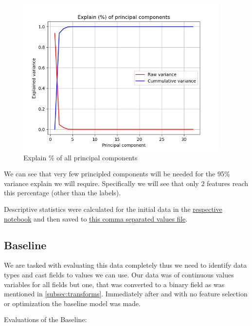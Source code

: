 \documentclass[12pt, a4paper]{article}
\begin{document}
\begin{figure}[H]
    \begin{center}
        \includegraphics[width=0.95\textwidth]{figures/Explain of all principaled components.png}
    \end{center}
    \caption{Explain \% of all principal components}\label{fig:PCA search}
\end{figure}

\begin{multicols}{2}

    We can see that very few principled components will be needed for the 95\% variance explain we will require. Specifically we will see that only $2$ features reach this percentage (other than the labels).
    \newline

    Descriptive statistics were calculated for the initial data in the \href{https://github.com/ArisPodotas/Assignment-2-MLICB/blob/master/notebooks/Feeling%20the%20data.ipynb}{respective notebook} and then saved to \href{https://github.com/ArisPodotas/Assignment-2-MLICB/blob/master/data/statistics.csv}{this comma separated values file}.
    \newline

    \subsection{Baseline} \label{subsec:baseline}

    We are tasked with evaluating this data completely thus we need to identify data types and cast fields to values we can use. Our data was of continuous values variables for all fields but one, that was converted to a binary field as was mentioned in \ref{subsec:transforms}. Immediately after and with no feature selection or optimization the baseline model was made.
    \newline

    Evaluations of the Baseline:
    \newline

\end{multicols}
\end{document}
